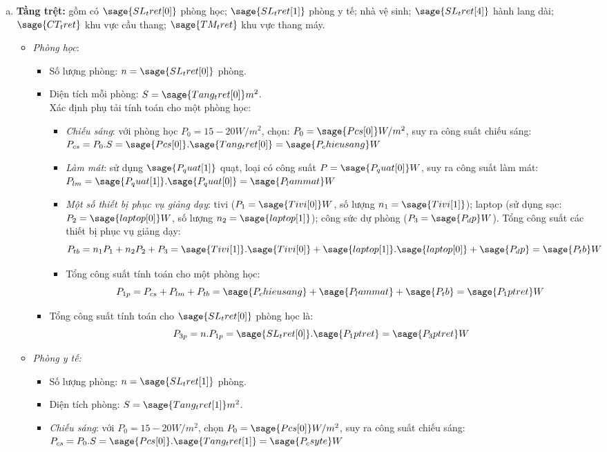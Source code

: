 \begin{enumerate}[a.]
\item \textbf{Tầng trệt:} gồm có $\sage{SL_tret[0]}$ phòng học; $\sage{SL_tret[1]}$ phòng y tế; nhà vệ sinh; $\sage{SL_tret[4]}$ hành lang dài; $\sage{CT_tret}$ khu vực cầu thang; $\sage{TM_tret}$ khu vực thang máy.
\begin{itemize}
\item \textit{Phòng học}:
\begin{itemize}
\item Số lượng phòng: $n = \sage{SL_tret[0]}$ phòng.
\item Diện tích mỗi phòng: $S = \sage{Tang_tret[0]}m^2$.\vspace{.3cm}\\
Xác định phụ tải tính toán cho một phòng học:
\begin{itemize}
\item \textit{Chiếu sáng}: với phòng học $P_0=15-20W/m^2$, chọn: $P_0=\sage{Pcs[0]}W/m^2$, suy ra công suất chiếu sáng: $P_{cs}=P_0.S= \sage{Pcs[0]}.\sage{Tang_tret[0]} =\sage{P_chieusang}W$
\item \textit{Làm mát}: sử dụng $\sage{P_quat[1]}$ quạt, loại có công suất $P=\sage{P_quat[0]}W$, suy ra công suất làm mát: $P_{lm}=\sage{P_quat[1]}.\sage{P_quat[0]}=\sage{P_lammat}W$
\item \textit{Một số thiết bị phục vụ giảng dạy}: tivi ($P_1=\sage{Tivi[0]}W$, số lượng $n_1 = \sage{Tivi[1]}$); laptop (sử dụng sạc: $P_2 = \sage{laptop[0]}W$, số lượng $n_2 = \sage{laptop[1]}$); công sức dự phòng ($P_3=\sage{P_dp}W$). Tổng công suất các thiết bị phục vụ giảng dạy: $$P_{tb}=n_1P_1 + n_2P_2 + P_3 = \sage{Tivi[1]}.\sage{Tivi[0]} + \sage{laptop[1]}.\sage{laptop[0]}+\sage{P_dp}=\sage{P_tb}W$$
\item Tổng công suất tính toán cho một phòng học:$$P_{1p} = P_{cs} + P_{lm} + P_{tb} = \sage{P_chieusang} + \sage{P_lammat} + \sage{P_tb} = \sage{P_1ptret}W$$
\end{itemize}
\item Tổng công suất tính toán cho $\sage{SL_tret[0]}$ phòng học là: $$P_{3p}= n.P_{1p} = \sage{SL_tret[0]}.\sage{P_1ptret} = \sage{P_3ptret}W$$
\end{itemize}
\item \textit{Phòng y tế:}
\begin{itemize}
\item Số lượng phòng: $n=\sage{SL_tret[1]}$ phòng.
\item Diện tích phòng: $S = \sage{Tang_tret[1]}m^2$.
\item \textit{Chiếu sáng}: với $P_0 = 15 - 20W/m^2$, chọn $P_0 = \sage{Pcs[0]}W/m^2$, suy ra công suất chiếu sáng: $P_{cs}=P_0.S = \sage{Pcs[0]}.\sage{Tang_tret[1]}=\sage{P_csyte}W$

\end{itemize}
\end{itemize}
\end{enumerate}
